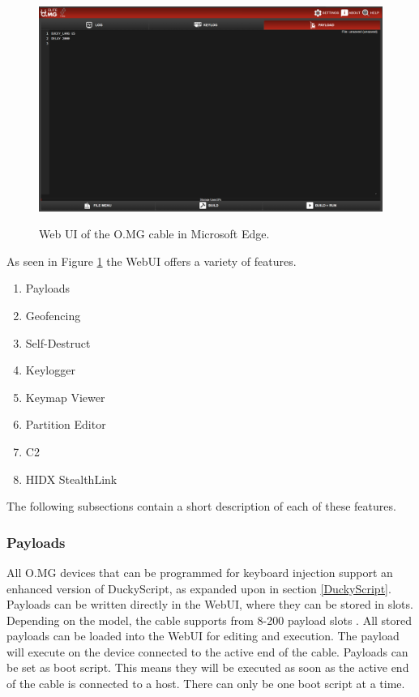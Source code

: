 \begin{figure}[H]
    \centering
    \includegraphics[width=1\linewidth]{visuals/O.MG_webUI.png}
    \caption{Web UI of the O.MG cable in Microsoft Edge.}
    \label{fig:O.MG_webUI}
    \cite{}
\end{figure}



As seen in Figure \ref{fig:O.MG_webUI} the WebUI offers a variety of features.

\begin{enumerate}
    \item Payloads
    \item Geofencing
    \item Self-Destruct
    \item Keylogger
    \item Keymap Viewer
    \item Partition Editor
    \item C2
    \item HIDX StealthLink
\end{enumerate}

The following subsections contain a short description of each of these features. 

\subsubsection{Payloads}

All O.MG devices that can be programmed for keyboard injection support an enhanced version of DuckyScript, as expanded upon in section \ref{DuckyScript}. \\
Payloads can be written directly in the WebUI, where they can be stored in slots. Depending on the model, the cable supports from 8-200 payload slots \cite{hak5MGCable}. All stored payloads can be loaded into the WebUI for editing and execution. The payload will execute on the device connected to the active end of the cable. Payloads can be set as boot script. This means they will be executed as soon as the active end of the cable is connected to a host. There can only be one boot script at a time. \\



